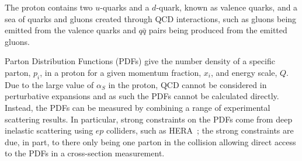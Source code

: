 The proton contains two $u$-quarks and a $d$-quark, known as valence quarks, and a sea of quarks and gluons created
through QCD interactions, such as gluons being emitted from the valence quarks and $q\bar{q}$ pairs being produced from the emitted gluons.

Parton Distribution Functions (PDFs) give the number density of a specific parton, $p_i$, in a proton
for a given momentum fraction, $x_i$, and energy scale, $Q$.
Due to the large value of $\alpha_S$ in the proton, QCD cannot be considered in perturbative expansions and as such the PDFs cannot be calculated directly.
Instead, the PDFs can be measured by combining a range of experimental scattering results.
In particular, strong constraints on the PDFs come from deep inelastic scattering using $ep$ colliders, such as HERA~\cite{theo-qcd_hera};
the strong constraints are due, in part, to there only being one parton in the collision allowing direct access to the PDFs in a cross-section measurement.


